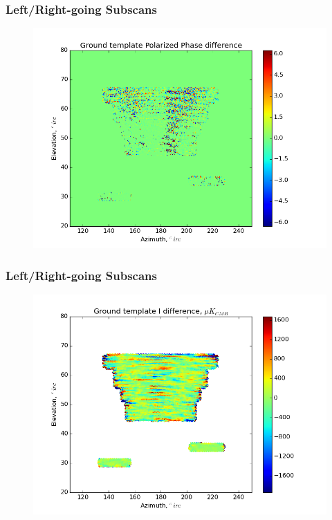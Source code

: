 \documentclass{beamer}
\begin{document}
\begin{frame}
\frametitle{Left/Right-going Subscans}
\begin{figure}
\includegraphics[width=0.9\linewidth]{dArg_gt_LR_SUBSCAN.png}
\end{figure}
\end{frame}

\begin{frame}
\frametitle{Left/Right-going Subscans}
\begin{figure}
\includegraphics[width=0.9\linewidth]{dI_gt_LR_SUBSCAN.png}
\end{figure}
\end{frame}
\end{document}
